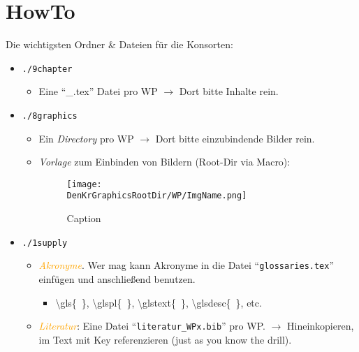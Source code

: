 %
\chapter*{HowTo}%

Die wichtigsten Ordner \& Dateien für die Konsorten:
\begin{itemize}
	\item \texttt{./\textcolor{RedOrange}{9chapter}}
	\begin{itemize}
		\item Eine \enquote{\_.tex} Datei pro WP $\rightarrow$ Dort bitte Inhalte rein.
	\end{itemize}
	\item \texttt{./\textcolor{RedOrange}{8graphics}}
	\begin{itemize}
		\item Ein \textit{Directory} pro WP $\rightarrow$ Dort bitte einzubindende Bilder rein.
		\item \textit{Vorlage} zum Einbinden von Bildern (Root-Dir via Macro):\par
\begin{DenKrLst}[language=DenKr-C,morekeywords={[3]{begin,end,caption,centering,includegraphics,linewidth,DenKrGraphicsRootDir}},morekeywords={[6]{figure}},morekeywords={[7]{label}},]{}{}
\begin{figure}[!ht]
	\centering
	\texttt{[image: \\DenKrGraphicsRootDir/WP/ImgName.png]}
	\caption{Caption}
	\label{fig:ImgLabel}
\end{figure}
\end{DenKrLst}
	\end{itemize}
	\item \texttt{./\textcolor{RedOrange}{1supply}}
	\begin{itemize}
		\item \textcolor{orange}{\textit{Akronyme}}. Wer mag kann Akronyme in die Datei \enquote{\textcolor{PineGreen}{\texttt{glossaries.tex}}} einfügen und anschließend benutzen.
			\begin{itemize}
				\item \textbackslash gls\{\ \}, \textbackslash glspl\{\ \}, \textbackslash glstext\{\ \}, \textbackslash glsdesc\{\ \}, etc.
			\end{itemize}
		\item \textcolor{orange}{\textit{Literatur}}: Eine Datei \enquote{\textcolor{PineGreen}{\texttt{literatur\_WPx.bib}}} pro WP. $\rightarrow$ Hineinkopieren, im Text mit Key referenzieren (just as you know the drill).
	\end{itemize}
\end{itemize}

